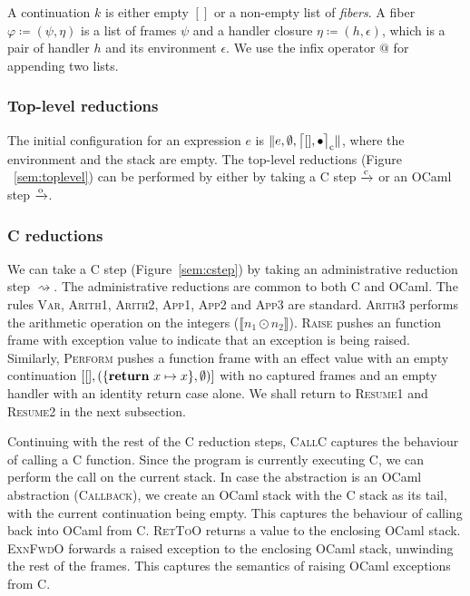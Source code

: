 \documentclass[sigplan,screen]{acmart}
\newcommand{\env}{\epsilon}
\newcommand{\kw}[1]{\text{\bf #1}}
\newcommand{\caseval}[2]{\kw{return}~#1 \mapsto #2}
\newcommand{\fiber}{\varphi}
\newcommand{\fl}{\psi} %
\newcommand{\hc}{\eta} %
\newcommand{\cstacka}[2]{\big \lceil #1, #2 \big \rceil_{\text c}} %
\newcommand{\configa}[3]{\|#1,#2,#3\|}
\newcommand{\ostep}{\xrightarrow{\text o}}
\newcommand{\cstep}{\xrightarrow{\text c}}
\begin{document}
A continuation $k$ is either empty $[]$ or a non-empty list of \emph{fibers}. A
fiber $\fiber \coloneqq (\fl,\hc)$ is a list of frames $\fl$ and a handler
closure $\hc \coloneqq (h,\env)$, which is a pair of handler $h$ and its
environment $\env$. We use the infix operator $@$ for appending two lists.

\subsubsection{Top-level reductions}

The initial configuration for an expression $e$ is
$\configa{e}{\emptyset}{\cstacka{[]}{\bullet}}$, where the environment and the
stack are empty. The top-level reductions (Figure ~\ref{sem:toplevel}) can be
performed by either by taking a C step $\cstep$ or an OCaml step $\ostep$.

\subsubsection{C reductions}

We can take a C step (Figure~\ref{sem:cstep}) by taking an administrative
reduction step $\rightsquigarrow$. The administrative reductions are common to
both C and OCaml. The rules \textsc{Var}, \textsc{Arith1}, \textsc{Arith2},
\textsc{App1}, \textsc{App2} and \textsc{App3} are standard. \textsc{Arith3}
performs the arithmetic operation on the integers ($\llbracket n_1 \odot n_2
\rrbracket$). \textsc{Raise} pushes an function frame with exception value to
indicate that an exception is being raised. Similarly, \textsc{Perform} pushes
a function frame with an effect value with an empty continuation
$[[],(\{\caseval{x}{x}\},\emptyset)]$ with no captured frames and an empty
handler with an identity return case alone. We shall return to \textsc{Resume1}
and \textsc{Resume2} in the next subsection.

Continuing with the rest of the C reduction steps, \textsc{CallC} captures the
behaviour of calling a C function. Since the program is currently executing C,
we can perform the call on the current stack. In case the abstraction is an
OCaml abstraction (\textsc{Callback}), we create an OCaml stack with the C
stack as its tail, with the current continuation being empty. This captures the
behaviour of calling back into OCaml from C. \textsc{RetToO} returns a value to
the enclosing OCaml stack. \textsc{ExnFwdO} forwards a raised exception to the
enclosing OCaml stack, unwinding the rest of the frames. This captures the
semantics of raising OCaml exceptions from C.
\end{document}
